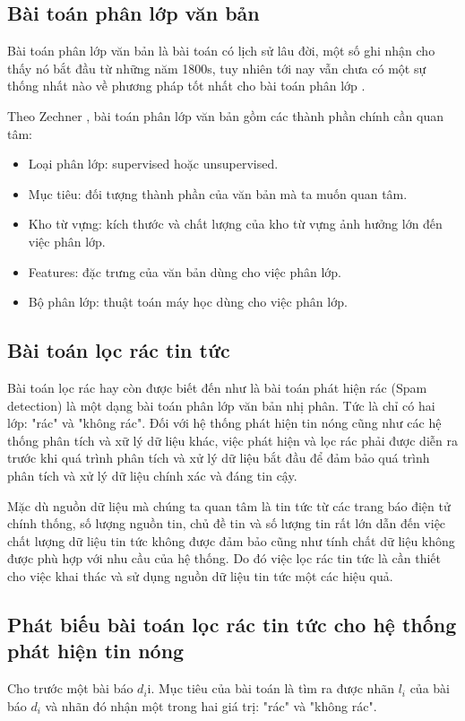 	\subsection{Bài toán phân lớp văn bản}
  Bài toán phân lớp văn bản là bài toán có lịch sử lâu đời, một số ghi nhận cho thấy nó bắt đầu từ những năm 1800s, tuy nhiên tới nay vẫn chưa có một sự thống nhất nào về phương pháp tốt nhất cho bài toán phân lớp \cite{zechner:history}. 
  
	Theo Zechner \cite{zechner:history}, bài toán phân lớp văn bản gồm các thành phần chính cần quan tâm: 
		\begin{itemize}
			\item Loại phân lớp: supervised hoặc unsupervised.
			\item Mục tiêu: đối tượng thành phần của văn bản mà ta muốn quan tâm.
			\item Kho từ vựng: kích thước và chất lượng của kho từ vựng ảnh hưởng lớn đến việc phân lớp.
			\item Features: đặc trưng của văn bản dùng cho việc phân lớp.
			\item Bộ phân lớp: thuật toán máy học dùng cho việc phân lớp.
		\end{itemize}

	\subsection{Bài toán lọc rác tin tức}
  Bài toán lọc rác hay còn được biết đến như là bài toán phát hiện rác (Spam detection) là một dạng bài toán phân lớp văn bản nhị phân. Tức là chỉ có hai lớp: "rác" và "không rác". Đối với hệ thống phát hiện tin nóng cũng như các hệ thống phân tích và xữ lý dữ liệu khác, việc phát hiện và lọc rác phải được diễn ra trước khi quá trình phân tích và xử lý dữ liệu bắt đầu để đảm bảo quá trình phân tích và xử lý dữ liệu chính xác và đáng tin cậy.

  Mặc dù nguồn dữ liệu mà chúng ta quan tâm là tin tức từ các trang báo điện tử chính thống, số lượng nguồn tin, chủ đề tin và số lượng tin rất lớn dẫn đến việc chất lượng dữ liệu tin tức không được đảm bảo cũng như tính chất dữ liệu không được phù hợp với nhu cầu của hệ thống. Do đó việc lọc rác tin tức là cần thiết cho việc khai thác và sử dụng nguồn dữ liệu tin tức một các hiệu quả.

  \subsection{Phát biếu bài toán lọc rác tin tức cho hệ thống phát hiện tin nóng}
  Cho trước một bài báo $d_i$i. Mục tiêu của bài toán là tìm ra được nhãn $l_i$ của bài báo $d_i$ và nhãn đó nhận một trong hai giá trị: "rác" và "không rác".
	
